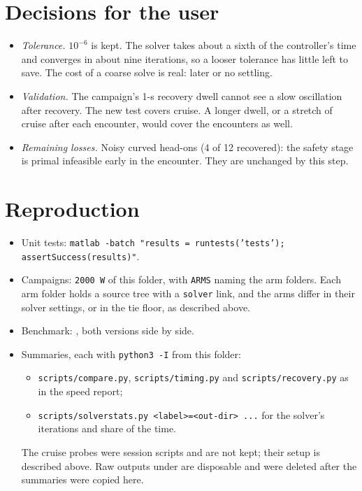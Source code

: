 \documentclass[11pt]{article}
\begin{document}
\section{Decisions for the user}
\begin{itemize}
\item \emph{Tolerance.} $10^{-6}$ is kept. The solver takes about a sixth
  of the controller's time and converges in about nine iterations, so a
  looser tolerance has little left to save. The cost of a coarse solve is
  real: later or no settling.
\item \emph{Validation.} The campaign's 1-s recovery dwell cannot see a
  slow oscillation after recovery. The new test covers cruise. A longer
  dwell, or a stretch of cruise after each encounter, would cover the
  encounters as well.
\item \emph{Remaining losses.} Noisy curved head-ons (4 of 12 recovered):
  the safety stage is primal infeasible early in the encounter. They are
  unchanged by this step.
\end{itemize}

\section{Reproduction}
\begin{itemize}
\item Unit tests: \texttt{matlab -batch "results = runtests('tests'); assertSuccess(results)"}.
\item Campaigns:  \texttt{2000 W} of this
  folder, with \texttt{ARMS} naming the arm folders. Each arm folder holds a
  source tree with a \texttt{solver} link, and the arms differ in their
  solver settings, or in the tie floor, as described above.
\item Benchmark: , both versions side by
  side.
\item Summaries, each with \texttt{python3 -I} from this folder:
  \begin{itemize}
  \item \texttt{scripts/compare.py}, \texttt{scripts/timing.py} and
    \texttt{scripts/recovery.py} as in the speed report;
  \item \texttt{scripts/solverstats.py <label>=<out-dir> ...} for the
    solver's iterations and share of the time.
  \end{itemize}
  The cruise probes were session scripts and are not kept; their setup is
  described above. Raw outputs under
   are
  disposable and were deleted after the summaries were copied here.
\end{itemize}
\end{document}
